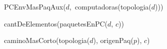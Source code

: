 \begin{tad}{}
	 {\mbox{PCEnvMasPaqAux($d$, computadoras(topologia($d$)))}}
	
	 {cantDeElementos(paquetesEnPC($d$, $c$))}
	
	 {caminoMasCorto(topologia($d$), origenPaq($p$), $c$)}
					
\end{tad}
